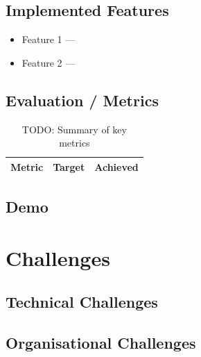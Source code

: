 \documentclass[a4paper,12pt]{article}
\begin{document}
\subsection{Implemented Features}
\begin{itemize}
    \item Feature 1 — %
    \item Feature 2 — %
\end{itemize}

\subsection{Evaluation / Metrics}

\begin{table}[h]
    \centering
    \begin{tabular}{lcc}
        \toprule
        Metric & Target & Achieved \\
        \midrule
        \bottomrule
    \end{tabular}
    \caption{TODO: Summary of key metrics}
\end{table}

\subsection{Demo}

\section{Challenges}


\subsection{Technical Challenges}

\subsection{Organisational Challenges}
\end{document}
